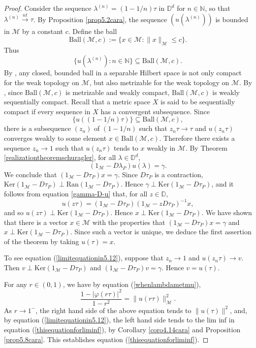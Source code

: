\documentclass[11pt, reqno]{amsart}
\newcommand\1{\boldsymbol {1}}
\newcommand{\D}{\mathbb{D}}
\numberwithin{equation}{section}
\begin{document}
\begin{proof}
Consider the sequence $\lambda^{(n)}=(1-1/n)\tau$ in $\mathbb{D}^{d}$ for $n\in\mathbb{N}$, so that $\lambda^{(n)}{\overset{nt}\rightarrow}\tau$. By Proposition \ref{prop5.2cara}, the sequence $(u(\lambda^{(n)}))$ is bounded in $\mathcal{M}$ by a constant $c$. Define the ball
$$\mathrm{Ball}(\mathcal{M}, c):=\{x\in\mathcal{M}:\|x\|_{\mathcal{M}}\leq c\}.$$
Thus
$$\{u(\lambda^{(n)}):n\in\mathbb{N}\}\subseteq \mathrm{Ball}(\mathcal{M}, c).$$
By \cite[Theorems 3.6.3 and  3.6.11]{BarrySimon}, any closed, bounded ball in a separable Hilbert space is not only compact for the weak topology on $\mathcal{M}$, but also metrizable for the weak topology on $\mathcal{M}$. By \cite[Theorem 2.3.6]{BarrySimon}, since $\mathrm{Ball}(\mathcal{M}, c)$ is metrizable and weakly compact, $\mathrm{Ball}(\mathcal{M}, c)$ is weakly sequentially compact. Recall that a metric space $X$ is said to be sequentially compact if every sequence in $X$ has a convergent subsequence.  Since $$\{u((1-1/n)\tau)\}\subseteq \mathrm{Ball}(\mathcal{M}, c),$$ there is a subsequence $(z_{n})$ of $(1-1/n)$ such that $z_{n}\tau\rightarrow\tau$ and $u(z_{n}\tau)$ converges weakly to some element $x\in\mathrm{Ball}(\mathcal{M}, c)$. Therefore there exists a sequence $z_{n}\rightarrow 1$ such that $u(z_{n}\tau)$ tends to $x$ weakly in $\mathcal{M}$. By Theorem \ref{realizationtheoremschuragler}, for all $\lambda \in \D^d$, 
$$ (1_{\mathcal{M}}-D\lambda_{P})u(\lambda)=\gamma.$$
We conclude that $(1_{\mathcal{M}}-D\tau_{P})x=\gamma$. Since $D\tau_{P}$ is a contraction, $\mathrm{Ker}(1_{\mathcal{M}}-D\tau_{P})\perp\mathrm{Ran}(1_{\mathcal{M}}-D\tau_{P})$. Hence $\gamma\perp\mathrm{Ker}(1_{\mathcal{M}}-D\tau_{P})$, and it follows from equation \eqref{gamma-D-u} that, for all $z\in\mathbb{D}$,
$$u(z\tau)=(1_{\mathcal{M}}-D\tau_{P})(1_{\mathcal{M}}-zD\tau_{P})^{-1}x,$$
and so $u(z\tau)\perp\mathrm{Ker}(1_{\mathcal{M}}-D\tau_{P})$. Hence $x\perp\mathrm{Ker}(1_{\mathcal{M}}-D\tau_{P})$. We have shown that there is a vector $x\in\mathcal{M}$ with the properties that $(1_{\mathcal{M}}-D\tau_{P})x=\gamma$ and $x\perp\mathrm{Ker}(1_{\mathcal{M}}-D\tau_{P})$. Since such a vector is unique, we deduce the first assertion of the theorem by taking $u(\tau)=x$. 

To see equation (\ref{limitequationin5.12}), suppose that $z_{n}\rightarrow 1$ and $u(z_{n}\tau)\rightarrow v$. Then $v\perp\mathrm{Ker}(1_{\mathcal{M}}-D\tau_{P})$ and $(1_{\mathcal{M}}-D\tau_{P})v=\gamma$. Hence $v=u(\tau)$.

For any $r\in(0,1)$, we have by  equation (\ref{whenlambdametmu}),
$$\dfrac{1-\lvert\varphi(r\tau)\rvert^{2}}{1-r^{2}}=\|u(r\tau)\|_{\mathcal{M}}^{2}.$$
As $r\rightarrow 1^{-}$, the right hand side of the above equation tends to $\|u(\tau)\|^{2}$, and, by equation (\ref{limitequationin5.12}), the left hand side tends to the lim inf in equation (\ref{thisequationforliminf}), by Corollary \ref{coro4.14cara} and Proposition \ref{prop5.8cara}. This establishes equation (\ref{thisequationforliminf}).\end{proof}
\end{document}

